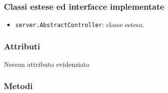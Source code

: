 \subsubsection*{Classi estese ed interfacce implementate}
\begin{itemize}
	\item \texttt{server.AbstractController}: classe estesa.
\end{itemize}

\subsubsection*{Attributi}

Nessun attributo evidenziato

\subsubsection*{Metodi}
